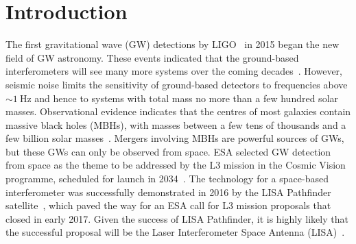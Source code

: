 \documentclass[a4paper]{jpconf}
\begin{document}
\section{Introduction}
The first gravitational wave (GW) detections by LIGO~\cite{GW150914,GW151226} in 2015 began the new field of GW astronomy. These events indicated that the ground-based interferometers will see many more systems over the coming decades~\cite{O1Summary}. However, seismic noise limits the sensitivity of ground-based detectors to frequencies above $\sim1~\mathrm{Hz}$ and hence to systems with total mass no more than a few hundred solar masses. Observational evidence indicates that the centres of most galaxies contain massive black holes (MBHs), with masses between a few tens of thousands and a few billion solar masses~\cite{croton}. Mergers involving MBHs are powerful sources of GWs, but these GWs can only be observed from space. ESA selected GW detection from space as the theme to be addressed by the L3 mission in the Cosmic Vision programme, scheduled for launch in 2034~\cite{tgu}. The technology for a space-based interferometer was successfully demonstrated in 2016 by the LISA Pathfinder satellite~\cite{LPFResults}, which paved the way for an ESA call for L3 mission proposals that closed in early 2017. Given the success of LISA Pathfinder, it is highly likely that the successful proposal will be the Laser Interferometer Space Antenna (LISA)~\cite{L3missprop}.
\end{document}
